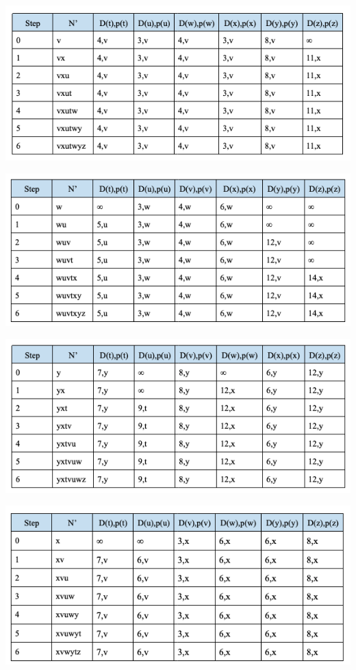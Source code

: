 \documentclass{article}
\begin{document}
\begin{center}
    \includegraphics[width=1\textwidth]{6-3.png}
\end{center}

\begin{center}
    \includegraphics[width=1\textwidth]{6-4.png}
\end{center}

\begin{center}
    \includegraphics[width=1\textwidth]{6-5.png}
\end{center}

\begin{center}
    \includegraphics[width=1\textwidth]{6-6.png}
\end{center}
\end{document}
